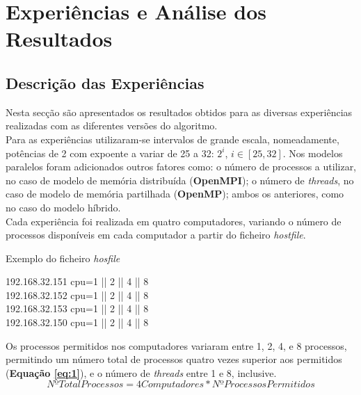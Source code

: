 \documentclass[a4paper]{article}
\begin{document}
\section{Experiências e Análise dos Resultados}
 
\subsection{Descrição das Experiências}

Nesta secção são apresentados os resultados obtidos para as diversas experiências realizadas com as diferentes versões do algoritmo.\\

Para as experiências utilizaram-se intervalos de grande escala, nomeadamente, potências de 2 com expoente a variar de 25 a 32: $2^i$, $i \in [25, 32]$. Nos modelos paralelos foram adicionados outros fatores como: o número de processos a utilizar, no caso de modelo de memória distribuída (\textbf{OpenMPI}); o número de \textit{threads}, no caso de modelo de memória partilhada (\textbf{OpenMP}); ambos os anteriores, como no caso do modelo híbrido.\\

Cada experiência foi realizada em quatro computadores, variando o número de processos disponíveis em cada computador a partir do ficheiro \textit{hostfile}.\\

\begin{mdframed}[style=MyFrame]
\begin{center}
\caption{Exemplo do ficheiro \textit{hosfile}\\}
192.168.32.151 cpu=1 || 2 || 4 || 8\\
192.168.32.152 cpu=1 || 2 || 4 || 8\\
192.168.32.153 cpu=1 || 2 || 4 || 8\\
192.168.32.150 cpu=1 || 2 || 4 || 8\\
\end{center}
\end{mdframed}

Os processos permitidos nos computadores variaram entre 1, 2, 4, e 8 processos, permitindo um número total de processos quatro vezes superior aos permitidos (\textbf{Equação \ref{eq:1}}), e o número de \textit{threads} entre 1 e 8, inclusive.
\begin{equation}
\label{eq:1}
Nº Total Processos = 4 Computadores * Nº Processos Permitidos
\end{equation}
\end{document}
